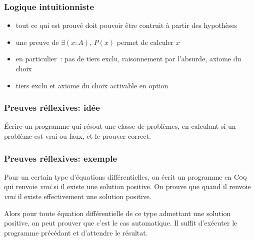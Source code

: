 \begin{frame}
  \frametitle{Logique intuitionniste}
  \begin{itemize}
    \item tout ce qui est prouvé doit pouvoir être contruit à partir des hypothèses
    \item une preuve de $\exists (x : A),\, P(x)$ permet de calculer $x$
    \item en particulier~: pas de tiers exclu, raisonnement par l'absurde, axiome du choix
    \item tiers exclu et axiome du choix activable en option
  \end{itemize}
\end{frame}

\begin{frame}
  \frametitle{Preuves réflexives: idée}
    Écrire un programme qui résout une classe de problèmes, en calculant si un problème est vrai ou faux, et le prouver correct.
\end{frame}
\begin{frame}
  \frametitle{Preuves réflexives: exemple}
  Pour un certain type d'équations différentielles, on écrit un programme en \textsc{Coq} qui renvoie \emph{vrai} si il existe une solution positive. On prouve que quand il renvoie \emph{vrai} il existe effectivement une solution positive.

  Alors pour toute équation différentielle de ce type admettant une solution positive, on peut prouver que c'est le cas automatique. Il suffit d'exécuter le programme précédant et d'attendre le résultat.
\end{frame}
